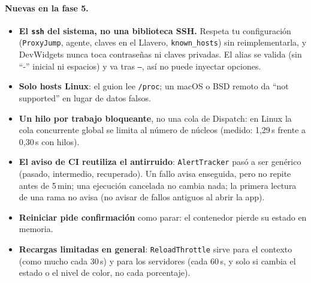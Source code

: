 \documentclass[11pt,a4paper]{article}
\begin{document}
\paragraph{Nuevas en la fase 5.}
\begin{itemize}
  \item \textbf{El \texttt{ssh} del sistema, no una biblioteca SSH.}
    Respeta tu configuración (\texttt{ProxyJump}, agente, claves en
    el Llavero, \texttt{known\_hosts}) sin reimplementarla, y
    DevWidgets nunca toca contraseñas ni claves privadas. El alias se
    valida (sin ``-'' inicial ni espacios) y va tras \texttt{--}, así
    no puede inyectar opciones.
  \item \textbf{Solo hosts Linux}: el guion lee \texttt{/proc}; un
    macOS o BSD remoto da ``not supported'' en lugar de datos falsos.
  \item \textbf{Un hilo por trabajo bloqueante}, no una cola de
    Dispatch: en Linux la cola concurrente global se limita al número
    de núcleos (medido: 1,29\,s frente a 0,30\,s con hilos).
  \item \textbf{El aviso de CI reutiliza el antirruido}:
    \texttt{AlertTracker} pasó a ser genérico (pasado, intermedio,
    recuperado). Un fallo avisa enseguida, pero no repite antes de
    5\,min; una ejecución cancelada no cambia nada; la primera lectura
    de una rama no avisa (no avisar de fallos antiguos al abrir la
    app).
  \item \textbf{Reiniciar pide confirmación} como parar: el contenedor
    pierde su estado en memoria.
  \item \textbf{Recargas limitadas en general}:
    \texttt{ReloadThrottle} sirve para el contexto (como mucho cada
    30\,s) y para los servidores (cada 60\,s, y solo si cambia el
    estado o el nivel de color, no cada porcentaje).
\end{itemize}
\end{document}
